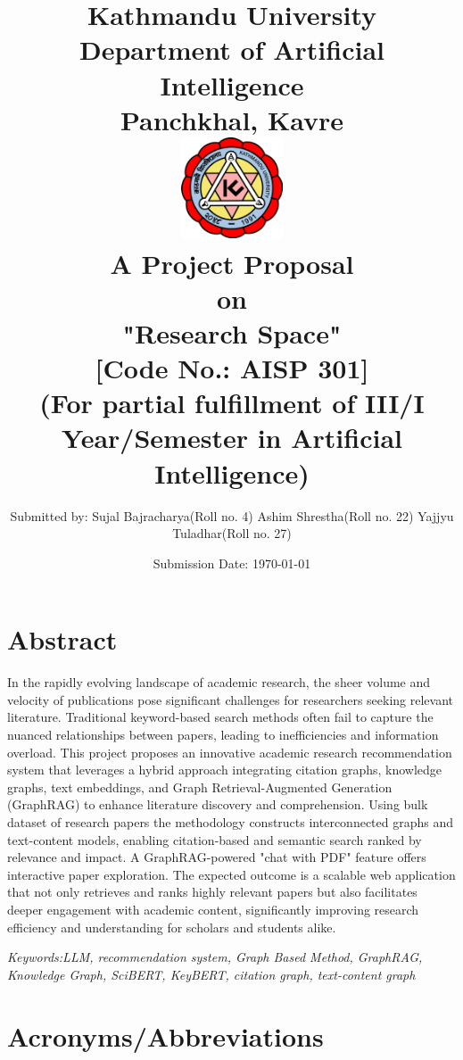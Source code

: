 \documentclass[a4paper,12pt]{article}
\title{
\textbf{
    Kathmandu University \\
    \large{Department of Artificial Intelligence}\\
    \normalsize{Panchkhal, Kavre}\\[1.5cm]}
    \includegraphics[width=3cm]{KU-Logo.png}\\[1cm]
    \normalsize{A Project Proposal\\on\\
    \textbf{"Research Space"}}\\[0.5cm]
    \normalsize{[Code No.: AISP 301]\\
    (For partial fulfillment of III/I Year/Semester in Artificial Intelligence)}\\[1cm]
}
\author[ ]{\normalsize{
        Submitted by: \linebreak
        Sujal Bajracharya(Roll no. 4)\linebreak
        Ashim Shrestha(Roll no. 22)\linebreak
        Yajjyu Tuladhar(Roll no. 27)
}}
\affil[ ]{\vspace{0.3cm}}
\affil[ ]{\normalsize{
        Submitted to: \linebreak
        Subodh Acharya \linebreak
        Department of Artificial Intelligence
}}
\date{\normalsize{Submission Date: \today}}
\begin{document}
\maketitle
\thispagestyle{empty}
\restoregeometry

\newpage
\setcounter{page}{1}

\section*{Abstract}
In the rapidly evolving landscape of academic research, the sheer volume and velocity
of publications pose significant challenges for researchers seeking relevant
literature. Traditional keyword-based search methods often fail to capture the
nuanced relationships between papers, leading to inefficiencies and information
overload. This project proposes an innovative academic research recommendation system
that leverages a hybrid approach integrating citation graphs, knowledge graphs, text
embeddings, and Graph Retrieval-Augmented Generation (GraphRAG) to enhance literature
discovery and comprehension. Using bulk dataset of research papers the methodology
constructs interconnected graphs and text-content models, enabling citation-based and
semantic search ranked by relevance and impact. A GraphRAG-powered "chat with PDF"
feature offers interactive paper exploration. The expected outcome is a scalable web
application that not only retrieves and ranks highly relevant papers but also
facilitates deeper engagement with academic content, significantly improving research
efficiency and understanding for scholars and students alike.

\textit{Keywords:LLM, recommendation system, Graph Based Method, GraphRAG,
Knowledge Graph, SciBERT, KeyBERT, citation graph, text-content graph}
\newpage

\tableofcontents
\newpage

\listoffigures
\newpage

\section*{Acronyms/Abbreviations}
\printglossary[type=\acronymtype, title=Acronyms/Abbreviations]
\newpage
\end{document}
